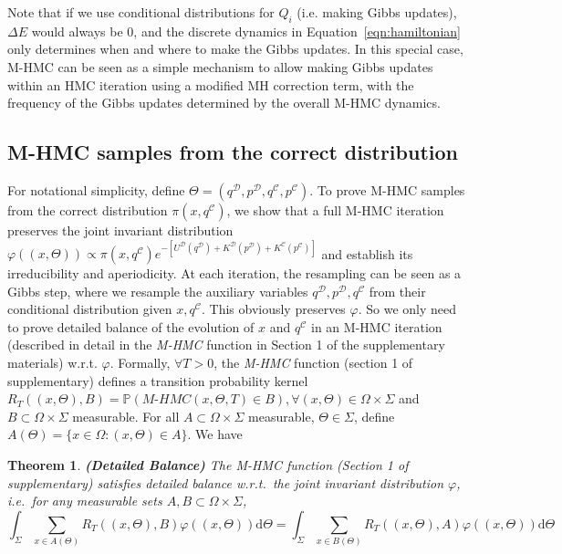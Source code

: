 \documentclass{article}
\newcommand{\cald}{\mathcal{D}}
\newcommand{\calc}{\mathcal{C}}
\newtheorem{theorem}{Theorem}
\begin{document}
Note that if we use conditional distributions for $Q_i$ (i.e. making Gibbs updates), $\Delta E$ would always be 0, and the discrete dynamics in Equation~\ref{eqn:hamiltonian} only determines when and where to make the Gibbs updates. In this special case, M-HMC can be seen as a simple mechanism to allow making Gibbs updates within an HMC iteration using a modified MH correction term, with the frequency of the Gibbs updates determined by the overall M-HMC dynamics.

\subsection{M-HMC samples from the correct distribution}

For notational simplicity, define $\Theta=(q^\cald, p^\cald, q^\calc, p^\calc)$. To prove M-HMC samples from the correct distribution $\pi(x, q^\calc)$, we show that a full M-HMC iteration preserves the joint invariant distribution $\varphi ((x, \Theta)) \propto \pi (x, q^\calc) e^{- \left[ U^\cald (q^\cald) + K^\cald (p^\cald) + K^\calc(p^\calc)\right]}$ and establish its irreducibility and aperiodicity. At each iteration, the resampling can be seen as a Gibbs step, where we resample the auxiliary variables $q^\cald, p^\cald, q^\calc$ from their conditional distribution given $x, q^\calc$. This obviously preserves $\varphi$.  So we only need to prove detailed balance of the evolution of $x$ and $q^\calc$ in an M-HMC iteration (described in detail in the {\textit{M-HMC}} function in Section 1 of the supplementary materials) w.r.t. $\varphi$. Formally, $\forall T > 0$, the {\textit{M-HMC}} function (section 1 of supplementary) defines a transition probability kernel $ R_T ((x, \Theta), B) =\mathbb{P} \left( \textit{M-HMC} (x, \Theta, T) \in B \right), \forall(x, \Theta) \in \Omega\times\Sigma$ and $B \subset \Omega\times\Sigma$ measurable. For all $A \subset \Omega\times\Sigma$ measurable, $\Theta \in \Sigma$, define $A (\Theta) = \{ x \in \Omega : (x, \Theta) \in A \}$. We have
\begin{theorem}
	{\textbf{(Detailed Balance)}} The \textit{M-HMC} function (Section 1 of supplementary) satisfies detailed balance w.r.t.\ the joint invariant distribution $\varphi $, i.e.\ for any measurable sets $A, B \subset \Omega\times\Sigma$,
\begin{equation*}
 \int_{\Sigma} \sum_{x \in A (\Theta)} R_T ((x, \Theta), B) \varphi ((x, \Theta))  \mathrm{d} \Theta = \int_{\Sigma} \sum_{x \in B (\Theta)} R_T ((x, \Theta), A) \varphi ((x, \Theta))  \mathrm{d}\Theta
\end{equation*}

\end{theorem}
\end{document}
